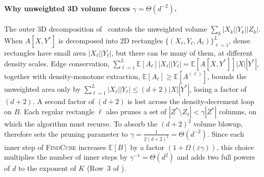 \documentclass[11pt]{article}
\theoremstyle{definition}
\newcommand{\E}{\mathbb{E}}
\newcommand{\abs}[1]{\left\lvert #1 \right\rvert}
\newcommand{\dens}[1]{\E[#1]}
\newcommand{\FindCube}{\textnormal{\textsc{FindCube}}}
\begin{document}
\paragraph{Why unweighted 3D volume forces $\gamma = \Theta(d^{-2})$.}
The outer 3D decomposition of~\cite{AFKLM24} controls the unweighted volume $\sum_k \abs{X_k}\abs{Y_k}\abs{Z_k}$. When $A[X, Y^*]$ is decomposed into 2D rectangles $\{(X_\ell, Y_\ell, A_\ell)\}_{\ell=1}^L$, dense rectangles have small area $\abs{X_\ell}\abs{Y_\ell}$, but there can be many of them, at different density scales. Edge conservation, $\sum_{\ell=1}^L \dens{A_\ell}\abs{X_\ell}\abs{Y_\ell} = \dens{A[X, Y^*]}\abs{X}\abs{Y^*}$, together with density-monotone extraction, $\dens{A_\ell} \ge \dens{A^{(\ell)}}$, bounds the unweighted area only by $\sum_{\ell=1}^L \abs{X_\ell}\abs{Y_\ell} \le (d+2)\abs{X}\abs{Y^*}$, losing a factor of $(d+2)$. A second factor of $(d+2)$ is lost across the density-decrement loop on $B$. Each regular rectangle $\ell$ also prunes a set of $\abs{Z^* \setminus Z_\ell} < \gamma\abs{Z^*}$ columns, on which the algorithm must recurse. To absorb the $(d+2)^2$ volume blowup, \cite{AFKLM24} therefore sets the pruning parameter to $\gamma = \frac{1}{2(d+2)^2} = \Theta(d^{-2})$. Since each inner step of \FindCube{} increases $\dens{B}$ by a factor $(1 + \Omega(\varepsilon\gamma))$, this choice multiplies the number of inner steps by $\gamma^{-1} = \Theta(d^2)$ and adds two full powers of $d$ to the exponent of $K$ (Row~3 of ).
\end{document}

